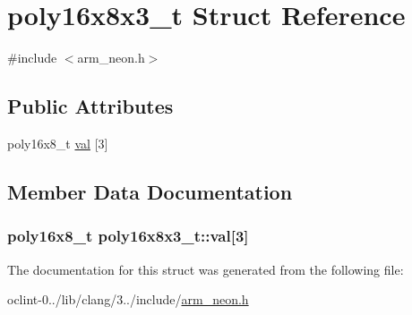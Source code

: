 \hypertarget{structpoly16x8x3__t}{\section{poly16x8x3\-\_\-t Struct Reference}
\label{structpoly16x8x3__t}
}


{\ttfamily \#include $<$arm\-\_\-neon.\-h$>$}

\subsection*{Public Attributes}
\begin{DoxyCompactItemize}
\item 
poly16x8\-\_\-t \hyperlink{structpoly16x8x3__t_a26d9e78d02db1c4d3a82f2e8f7976057}{val} \mbox{[}3\mbox{]}
\end{DoxyCompactItemize}


\subsection{Member Data Documentation}
\hypertarget{structpoly16x8x3__t_a26d9e78d02db1c4d3a82f2e8f7976057}{
\subsubsection[{val}]{\setlength{\rightskip}{0pt plus 5cm}poly16x8\-\_\-t poly16x8x3\-\_\-t\-::val\mbox{[}3\mbox{]}}}\label{structpoly16x8x3__t_a26d9e78d02db1c4d3a82f2e8f7976057}


The documentation for this struct was generated from the following file\-:\begin{DoxyCompactItemize}
\item 
oclint-\/0../lib/clang/3../include/\hyperlink{arm__neon_8h}{arm\-\_\-neon.\-h}\end{DoxyCompactItemize}

